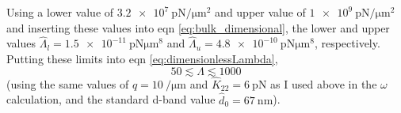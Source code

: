 \documentclass[12pt]{article}
\begin{document}
Using a lower value of $\SI{3.2e7}{\pico\newton\per\micro\meter^2}$ and upper value of $\SI{1e9}{\pico\newton\per\micro\meter^2}$ and inserting these values into eqn \ref{eq:bulk_dimensional}, the lower and upper values $\hat{\Lambda}_l=\SI{1.5e-11}{\pico\newton\micro\meter^8}$ and $\hat{\Lambda}_u=\SI{4.8e-10}{\pico\newton\micro\meter^8}$, respectively. Putting these limits into eqn \ref{eq:dimensionlessLambda},
\begin{equation}\label{eq:Lambda}
50\lesssim\Lambda\lesssim1000
\end{equation}
(using the same values of $\hat{q}=\SI{10}{\per\micro\meter}$ and $\hat{K}_{22}=\SI{6}{\pico\newton}$ as I used above in the $\omega$ calculation, and the standard d-band value $\hat{d}_0=\SI{67}{\nano\meter}$).
\clearpage


\end{document}
